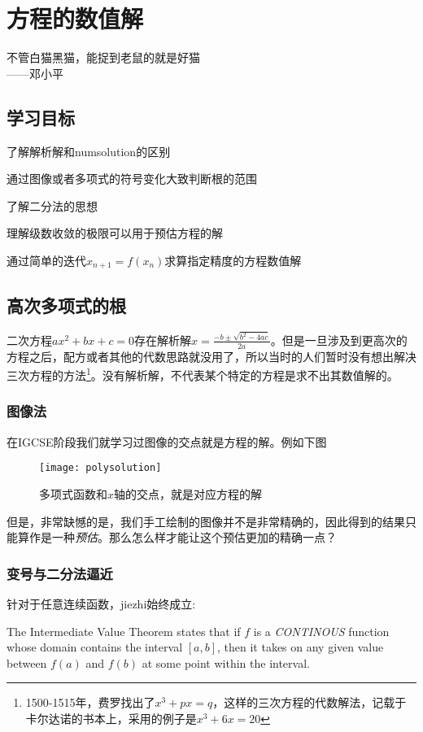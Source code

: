 \chapter{方程的数值解}
不管白猫黑猫，能捉到老鼠的就是好猫\\
\makebox{}\hfill——邓小平

\section*{学习目标}
\begin{todolist}
 \item 了解解析解和\gls{numsolution}的区别
 \item 通过图像或者多项式的符号变化大致判断根的范围
 \item 了解二分法的思想
 \item 理解级数收敛的极限可以用于预估方程的解
 \item 通过简单的迭代$x_{n+1} = f(x_n)$求算指定精度的方程数值解
\end{todolist}
\clearpage

\section{高次多项式的根}
二次方程$ax^2+bx+c=0$存在解析解$x=\frac{-b\pm \sqrt{b^2-4ac}}{2a}$。但是一旦涉及到更高次的方程之后，配方或者其他的代数思路就没用了，所以当时的人们暂时没有想出解决三次方程的方法\footnote{1500-1515年，费罗找出了$x^3+px=q$，这样的三次方程的代数解法，记载于卡尔达诺的书本上，采用的例子是$x^3+6x=20$}。没有解析解，不代表某个特定的方程是求不出其数值解的。

\subsection*{图像法}
在IGCSE阶段我们就学习过图像的交点就是方程的解。例如下图
\begin{figure}[H]
\centering
\texttt{[image: polysolution]}
\caption{多项式函数和$x$轴的交点，就是对应方程的解}
\end{figure}
但是，非常缺憾的是，我们手工绘制的图像并不是非常精确的，因此得到的结果只能算作是一种\emph{预估}。那么怎么样才能让这个预估更加的精确一点？

\subsection*{变号与二分法逼近}
针对于任意连续函数，\gls{jiezhi}始终成立:
\begin{theorem}
The Intermediate Value Theorem states that if $f$ is a \emph{CONTINOUS} function whose domain contains the interval $[a, b]$, then it takes on any given value between $f(a)$ and $f(b)$ at some point within the interval.
\end{theorem}

